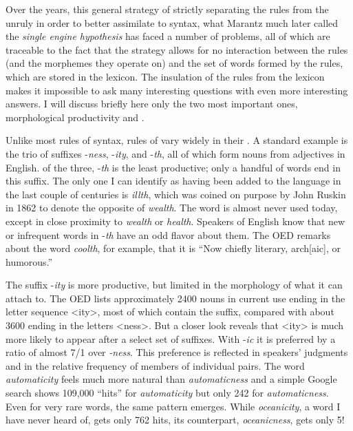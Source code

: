 \documentclass[output=paper]{langsci/langscibook}
\begin{document}
Over the years, this general strategy of strictly separating the rules
from the unruly in order to better assimilate  to syntax,
what Marantz much later called the \emph{single engine hypothesis}
%
\citep{Marantz2005} %
%
has faced a number of problems, all of which are
traceable to the fact that the strategy allows for no interaction
between the rules (and the morphemes they operate on) and the set of
words formed by the rules, which are stored in the lexicon. The
insulation of the rules from the lexicon makes it impossible to ask many
interesting questions with even more interesting answers. I will discuss
briefly here only the two most important ones, morphological
productivity and .

Unlike most rules of syntax, rules of  vary widely in
their . A standard example is the trio of suffixes
-\emph{ness}, -\emph{ity}, and -\emph{th}, all of which form nouns from
adjectives in English. of the three, -\emph{th} is the least productive;
only a handful of words end in this suffix. The only one I can identify
as having been added to the language in the last couple of centuries is
\emph{illth}, which was coined on purpose by John Ruskin in 1862 to
denote the opposite of \emph{wealth}. The word is almost never used
today, except in close proximity to \emph{wealth} or \emph{health}.
Speakers of English know that new or infrequent words in -\emph{th} have
an odd flavor about them. The OED remarks about the word \emph{coolth},
for example, that it is ``Now chiefly literary, arch{[}aic{]}, or
humorous.''

The suffix -\emph{ity} is more productive, but limited in the morphology
of what it can attach to. The OED lists approximately 2400 nouns in
current use ending in the letter sequence \textless{}ity\textgreater{},
most of which contain the suffix, compared with about 3600 ending in the
letters \textless{}ness\textgreater{}. But a closer look reveals that
\textless{}ity\textgreater{} is much more likely to appear after a
select set of suffixes. With -\emph{ic} it is preferred by a ratio of
almost 7/1 over \emph{-ness}. This preference is reflected in speakers'
judgments and in the relative frequency of members of individual pairs.
The word \emph{automaticity} feels much more natural than
\emph{automaticness} and a simple Google search shows 109,000 ``hits''
for \emph{automaticity} but only 242 for \emph{automaticness}. Even for
very rare words, the same pattern emerges. While \emph{oceanicity}, a
word I have never heard of, gets only 762 hits, its counterpart,
\emph{oceanicness}, gets only 5!
\end{document}
